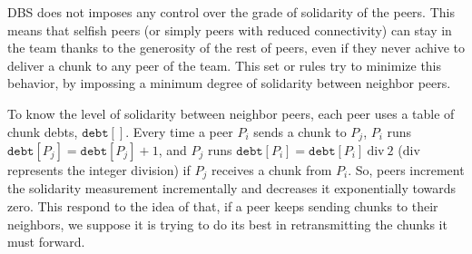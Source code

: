 
\begin{comment}
Notice that in this example, for the sake of simplicity, a simple
round-robing pending scheduler has been used.  Actually, DBS selects
the $\mathtt{pending}[]$ entries using the supportivity information
gathered from the neighbors. This information is stored in a
$\mathtt{supportivity}[]$ table, which is indexed by the neighbors
end-points. When the list of peers is received from the splitter, all
the peers have the same supportivity. These supportivity values are
incremented each time a chunk is received from the corresponding
neighbor and decremented each time a chunk is received form the
splitter (i.e., in each round). Thus, supportive neighbors will tend
to have a higher supportivity than unsupportive neighbors.
\end{comment}

DBS does not imposes any control over the grade of solidarity of the
peers. This means that selfish peers (or simply peers with reduced
connectivity) can stay in the team thanks to the generosity of the
rest of peers, even if they never achive to deliver a chunk to any
peer of the team. This set or rules try to minimize this behavior,
by impossing a minimum degree of solidarity between neighbor peers.

To know the level of solidarity between neighbor peers, each peer uses
a table of chunk debts, $\mathtt{debt}[]$. Every time a peer $P_i$
sends a chunk to $P_j$, $P_i$ runs $\mathtt{debt}[P_j] =
\mathtt{debt}[P_j]+1$, and $P_j$ runs $\mathtt{debt}[P_i] =
\mathtt{debt}[P_i]~\text{div}~2$ ($\text{div}$ represents the integer
division) if $P_j$ receives a chunk from $P_i$. So, peers increment
the solidarity measurement incrementally and decreases it
exponentially towards zero. This respond to the idea of that, if a
peer keeps sending chunks to their neighbors, we suppose it is trying
to do its best in retransmitting the chunks it must forward.

